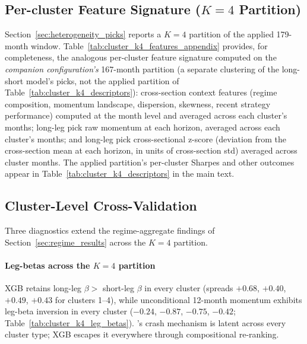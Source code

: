 \subsection{Per-cluster Feature Signature ($K=4$ Partition)}\label{app:cluster_k4_features}

Section~\ref{sec:heterogeneity_picks} reports a $K=4$ partition of the applied 179-month window. Table~\ref{tab:cluster_k4_features_appendix} provides, for completeness, the analogous per-cluster feature signature computed on the \emph{companion configuration's} 167-month partition (a separate clustering of the long-short model's picks, not the applied partition of Table~\ref{tab:cluster_k4_descriptors}): cross-section context features (regime composition, momentum landscape, dispersion, skewness, recent strategy performance) computed at the month level and averaged across each cluster's months; long-leg pick raw momentum at each horizon, averaged across each cluster's months; and long-leg pick cross-sectional z-score (deviation from the cross-section mean at each horizon, in units of cross-section std) averaged across cluster months. The applied partition's per-cluster Sharpes and other outcomes appear in Table~\ref{tab:cluster_k4_descriptors} in the main text.



\subsection{Cluster-Level Cross-Validation}\label{app:cluster_cross_validation}

Three diagnostics extend the regime-aggregate findings of Section~\ref{sec:regime_results} across the $K=4$ partition.

\paragraph{Leg-betas across the $K=4$ partition}
XGB retains long-leg $\beta >$ short-leg $\beta$ in every cluster (spreads $+0.68$, $+0.40$, $+0.49$, $+0.43$ for clusters 1--4), while unconditional 12-month momentum exhibits leg-beta inversion in every cluster ($-0.24$, $-0.87$, $-0.75$, $-0.42$; Table~\ref{tab:cluster_k4_leg_betas}). \citet{DanielMoskowitz2016}'s crash mechanism is latent across every cluster type; XGB escapes it everywhere through compositional re-ranking.



